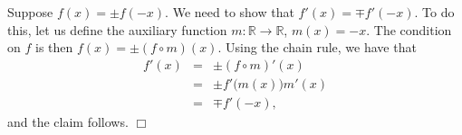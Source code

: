 \documentclass[12pt]{article}
\begin{document}
Suppose $f(x)=\pm f(-x)$. We need to show that
$f'(x)=\mp f'(-x)$.
To do this, let us define the auxiliary function
$m:\mathbb{R}\to \mathbb{R}$, $m(x)=-x$.
The condition on $f$ is then $f(x) = \pm (f\circ m)(x)$.
Using the chain rule, we have that
\begin{eqnarray*}
f'(x) &=& \pm(f\circ m)'(x) \\
    &=& \pm f'\big(m(x)\big) m'(x)\\
    &=& \mp f'(-x),
\end{eqnarray*}
and the claim follows. $\Box$
\end{document}
